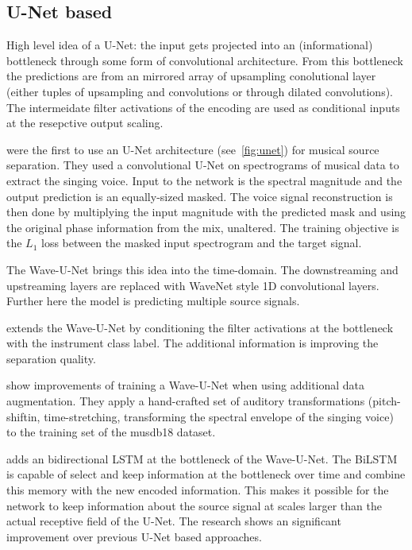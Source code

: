 \subsection{U-Net based}
\begin{marginfigure}[-10em]
    \caption{High level idea of a U-Net: the input gets projected into an (informational) bottleneck through some form of convolutional architecture. From this bottleneck the predictions are from an mirrored array of upsampling conolutional layer (either tuples of upsampling and convolutions or through dilated convolutions). The intermeidate filter activations of the encoding are used as conditional inputs at the resepctive output scaling.}%
    \label{fig:unet}
\end{marginfigure}

\textcite{janssonSinging2017} were the first to use an U-Net architecture (see~\cref{fig:unet}) for musical source separation. They used a convolutional U-Net on spectrograms of musical data to extract the singing voice. Input to the network is the spectral magnitude and the output prediction is an equally-sized masked. The voice signal reconstruction is then done by multiplying the input magnitude with the predicted mask and using the original phase information from the mix, unaltered. The training objective is the \(L_1\) loss between the masked input spectrogram and the target signal.

The Wave-U-Net\cite{stollerWaveUNet2018} brings this idea into the time-domain. The downstreaming and upstreaming layers are replaced with WaveNet style 1D convolutional layers. Further here the model is predicting multiple source signals.

\textcite{slizovskaiaEndtoEnd2019} extends the Wave-U-Net by conditioning the filter activations at the bottleneck with the instrument class label. The additional information is improving the separation quality.

\textcite{cohen-hadriaImproving2019} show improvements of training a Wave-U-Net when using additional data augmentation. They apply a hand-crafted set of auditory transformations (pitch-shiftin, time-stretching, transforming the spectral envelope of the singing voice) to the training set of the musdb18 dataset.

\textcite{kaspersenHydraNet2019} adds an bidirectional LSTM at the bottleneck of the Wave-U-Net. The BiLSTM is capable of select and keep information at the bottleneck over time and combine this memory with the new encoded information. This makes it possible for the network to keep information about the source signal at scales larger than the actual receptive field of the U-Net. The research shows an significant improvement over previous U-Net based approaches.

